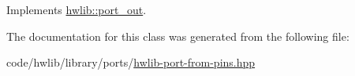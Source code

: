 Implements \hyperlink{classhwlib_1_1port__out_a3644bf484ebe059ec5bf17fa43e0c01b}{hwlib\+::port\+\_\+out}.



The documentation for this class was generated from the following file\+:\begin{DoxyCompactItemize}
\item 
code/hwlib/library/ports/\hyperlink{hwlib-port-from-pins_8hpp}{hwlib-\/port-\/from-\/pins.\+hpp}\end{DoxyCompactItemize}
